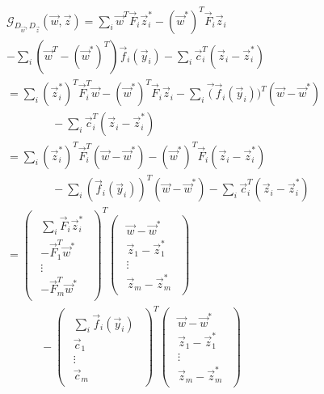 \documentclass{article}
\begin{document}
\begin{equation}
  \begin{aligned}
    &\mathcal{G}_{D_{\vec w},D_{\vec z}}(\vec w, \vec z) = \sum_i \vec w^T \vec F_i \vec z_i^* - (\vec w^*)^T \vec F_i \vec z_i\\
    &- \sum_i (\vec w^T - (\vec w^*)^T ) \vec f_i (\vec y_i)- \sum_i \vec c_i^T (\vec z_i - \vec z_i^*)\\
    &= \sum_i (\vec z_i^*)^T \vec F_i^T \vec w - (\vec w^*)^T \vec F_i \vec z_i - \sum_i \vec (\vec f_i (\vec y_i))^T (\vec w - \vec w^*)\\
    &\quad\quad\quad\quad- \sum_i \vec c_i^T (\vec z_i - \vec z_i^*)\\
    &= \sum_i (\vec z_i^*)^T \vec F_i^T (\vec w - \vec w^*) - (\vec w^*)^T \vec F_i (\vec z_i - \vec z_i^*)\\
    &\quad\quad\quad\quad- \sum_i (\vec f_i(\vec y_i))^T (\vec w - \vec w^*) - \sum_i \vec c_i^T (\vec z_i - \vec z_i^*)\\
    &=  
    \begin{pmatrix}
      \begin{array}{c}
        \sum_i \vec F_i \vec z_i^*\\
	-\vec F_1^T \vec w^*\\
	\vdots\\
	-\vec F_m^T \vec w^*
      \end{array}
    \end{pmatrix}^T 
    \begin{pmatrix}
      \begin{array}{c}
	\vec w - \vec w^*\\
	\vec z_1 - \vec z_1^*\\
	\vdots\\
	\vec z_m - \vec z_m^*
      \end{array}
    \end{pmatrix}\\
    &\quad\quad\quad-\begin{pmatrix}
      \begin{array}{c}
	\sum_i \vec f_i(\vec y_i)\\
	\vec c_1\\
	\vdots\\
	\vec c_m
      \end{array}
    \end{pmatrix}^T
    \begin{pmatrix}
      \begin{array}{c}
	\vec w - \vec w^*\\
	\vec z_1 - \vec z_1^*\\
	\vdots\\
	\vec z_m - \vec z_m^*
      \end{array}
    \end{pmatrix}
  \end{aligned}
\end{equation}
\end{document}
